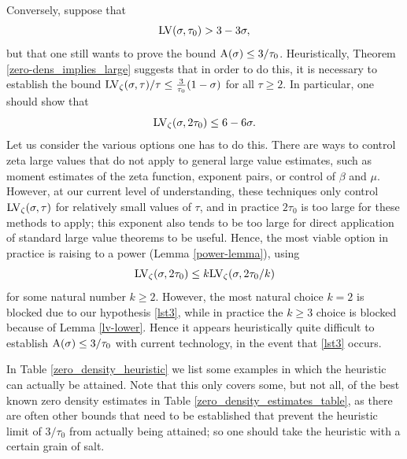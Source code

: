 Conversely, suppose that
\begin{equation}\label{lst3}
    \mathrm{LV}(\sigma,\tau_0) > 3-3\sigma,
\end{equation}
but that one still wants to prove the bound $\mathrm{A}(\sigma) \leq 3/\tau_0$. Heuristically, Theorem \ref{zero-dens_implies_large} suggests that in order to do this, it is necessary to establish the bound $\mathrm{LV}_\zeta(\sigma,\tau)/\tau \leq \frac{3}{\tau_0}(1-\sigma)$ for all $\tau \geq 2$.  In particular, one should show that
$$ \mathrm{LV}_\zeta(\sigma,2\tau_0) \leq 6-6\sigma.$$
Let us consider the various options one has to do this.  There are ways to control zeta large values that do not apply to general large value estimates, such as moment estimates of the zeta function, exponent pairs, or control of $\beta$ and $\mu$.  However, at our current level of understanding, these techniques only control $\mathrm{LV}_\zeta(\sigma,\tau)$ for relatively small values of $\tau$, and in practice $2\tau_0$ is too large for these methods to apply; this exponent also tends to be too large for direct application of standard large value theorems to be useful.  Hence, the most viable option in practice is raising to a power (Lemma \ref{power-lemma}), using
$$ \mathrm{LV}_\zeta(\sigma,2\tau_0) \leq k \mathrm{LV}_\zeta(\sigma,2\tau_0/k)$$
for some natural number $k \geq 2$.  However, the most natural choice $k=2$ is blocked due to our hypothesis \eqref{lst3}, while in practice the $k \geq 3$ choice is blocked because of Lemma \ref{lv-lower}.  Hence it appears heuristically quite difficult to establish $\mathrm{A}(\sigma) \leq 3/\tau_0$ with current technology, in the event that \eqref{lst3} occurs.

In Table \ref{zero_density_heuristic} we list some examples in which the heuristic can actually be attained.  Note that this only covers some, but not all, of the best known zero density estimates in Table \ref{zero_density_estimates_table}, as there are often other bounds that need to be established that prevent the heuristic limit of $3/\tau_0$ from actually being attained; so one should take the heuristic with a certain grain of salt.


